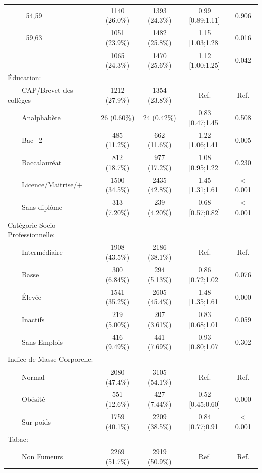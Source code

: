 \documentclass{book}
\begin{document}
\begin{longtable}{lcccc}
$\qquad$ ]54,59] & 1140 (26.0\%) & 1393 (24.3\%) & 0.99 [0.89;1.11] &  0.906 \\ 
$\qquad$ ]59,63] & 1051 (23.9\%) & 1482 (25.8\%) & 1.15 [1.03;1.28] &  0.016 \\ 
$\qquad$ $\>$ & 1065 (24.3\%) & 1470 (25.6\%) & 1.12 [1.00;1.25] &  0.042 \\ 
Éducation: &              &              &                  &        \\ 
$\qquad$CAP/Brevet des collèges & 1212 (27.9\%) & 1354 (23.8\%) &       Ref.       &  Ref.  \\ 
$\qquad$Analphabète &  26 (0.60\%)  &  24 (0.42\%)  & 0.83 [0.47;1.45] &  0.508 \\ 
$\qquad$Bac+2 & 485 (11.2\%)  & 662 (11.6\%)  & 1.22 [1.06;1.41] &  0.005 \\ 
$\qquad$Baccalauréat & 812 (18.7\%)  & 977 (17.2\%)  & 1.08 [0.95;1.22] &  0.230 \\ 
$\qquad$Licence/Maitrise/+ & 1500 (34.5\%) & 2435 (42.8\%) & 1.45 [1.31;1.61] & $<$0.001 \\ 
$\qquad$Sans diplôme & 313 (7.20\%)  & 239 (4.20\%)  & 0.68 [0.57;0.82] & $<$0.001 \\ 
Catégorie Socio-Professionnelle: &              &              &                  &        \\ 
$\qquad$Intermédiaire & 1908 (43.5\%) & 2186 (38.1\%) &       Ref.       &  Ref.  \\ 
$\qquad$Basse & 300 (6.84\%)  & 294 (5.13\%)  & 0.86 [0.72;1.02] &  0.076 \\ 
$\qquad$Élevée & 1541 (35.2\%) & 2605 (45.4\%) & 1.48 [1.35;1.61] &  0.000 \\ 
$\qquad$Inactifs & 219 (5.00\%)  & 207 (3.61\%)  & 0.83 [0.68;1.01] &  0.059 \\ 
$\qquad$Sans Emplois & 416 (9.49\%)  & 441 (7.69\%)  & 0.93 [0.80;1.07] &  0.302 \\ 
Indice de Masse Corporelle: &              &              &                  &        \\ 
$\qquad$Normal & 2080 (47.4\%) & 3105 (54.1\%) &       Ref.       &  Ref.  \\ 
$\qquad$Obésité & 551 (12.6\%)  & 427 (7.44\%)  & 0.52 [0.45;0.60] &  0.000 \\ 
$\qquad$Sur-poids & 1759 (40.1\%) & 2209 (38.5\%) & 0.84 [0.77;0.91] & $<$0.001 \\ 
Tabac: &              &              &                  &        \\ 
$\qquad$Non Fumeurs & 2269 (51.7\%) & 2919 (50.9\%) &       Ref.       &  Ref.  \\ 

\end{longtable}
\end{document}
